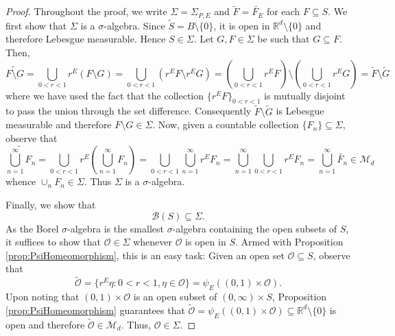 \documentclass[11pt]{article}
\theoremstyle{remark}
\begin{document}
\begin{proof}
Throughout the proof, we write $\Sigma=\Sigma_{P,E}$ and $\widetilde{F}=\widetilde{F_E}$ for each $F\subseteq S$.
We first show that $\Sigma$ is a $\sigma$-algebra. Since $\widetilde S=B\setminus\{0\}$, it is open in $\mathbb{R}^d\setminus\{0\}$ and therefore Lebesgue measurable. Hence $S\in \Sigma$. Let $G, F\in \Sigma$ be such that $G\subseteq F$. Then,
\begin{equation*}
\widetilde{F\setminus G}=\bigcup_{0<r<1}r^E\left(F\setminus G\right)=\bigcup_{0<r<1}\left(r^EF\setminus r^E G\right)=\left(\bigcup_{0<r<1}r^E F\right)\setminus\left(\bigcup_{0<r<1}r^E G\right)=\widetilde F\setminus \widetilde G
\end{equation*}
where we have used the fact that the collection $\{r^E F\}_{0<r<1}$ is mutually disjoint to pass the union through the set difference. Consequently $\widetilde F\setminus \widetilde{G}$ is Lebesgue measurable and therefore $F\setminus G\in \Sigma$.  Now, given a countable collection $\{F_n\}\subseteq \Sigma$, observe that
\begin{equation*}
    \widetilde{\bigcup_{n=1}^\infty F_n}= \bigcup_{0<r<1}r^E \left(\bigcup_{n=1}^\infty F_n\right)= \bigcup_{0 <r< 1}  \bigcup_{n=1}^\infty  r^E F_n =\bigcup_{n=1}^\infty \bigcup_{0 <r < 1}  r^E F_n =\bigcup_{n=1}^\infty \widetilde{F_n} \in \mathcal{M}_d
\end{equation*}
whence $\cup_n F_n\in \Sigma$. Thus $\Sigma$ is a $\sigma$-algebra. 

Finally, we show that
\begin{equation*}
\mathcal{B}(S)\subseteq\Sigma.
\end{equation*}
As the Borel $\sigma$-algebra is the smallest $\sigma$-algebra containing the open subsets of $S$, it suffices to show that $\mathcal{O}\in \Sigma$ whenever $\mathcal{O}$ is open in $S$. Armed with Proposition \ref{prop:PsiHomeomorphism}, this is an easy task: Given an open set $\mathcal{O}\subseteq S$, observe that
\begin{equation*}
\widetilde{\mathcal{O}}=\{r^E\eta:0<r<1,\eta\in\mathcal{O}\}=\psi_E((0,1)\times\mathcal{O}).
\end{equation*}
Upon noting that $(0,1)\times\mathcal{O}$ is an open subset of $(0,\infty)\times S$, Proposition \ref{prop:PsiHomeomorphism} guarantees that $\widetilde{\mathcal{O}}=\psi_E((0,1)\times\mathcal{O})\subseteq\mathbb{R}^d\setminus\{0\}$ is open and therefore $\widetilde{\mathcal{O}} \in \mathcal{M}_d$. Thus, $\mathcal{O}\in \Sigma$.
\end{proof}
\end{document}
